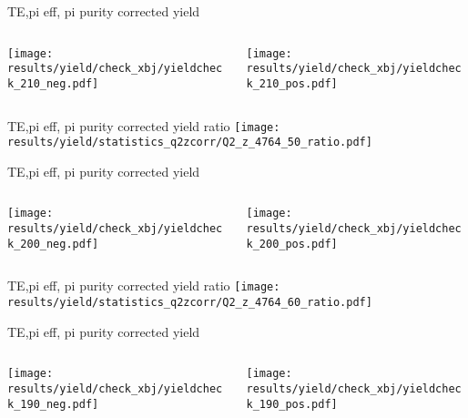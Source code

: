 \begin{frame}{TE,pi eff, pi purity corrected yield}
\begin{columns}
\begin{column}[T]{0.5\textwidth}
\texttt{[image: results/yield/check\_xbj/yieldcheck\_210\_neg.pdf]}
\end{column}
\begin{column}[T]{0.5\textwidth}
\texttt{[image: results/yield/check\_xbj/yieldcheck\_210\_pos.pdf]}
\end{column}
\end{columns}
\end{frame}
\begin{frame}{TE,pi eff, pi purity corrected yield ratio}
\texttt{[image: results/yield/statistics\_q2zcorr/Q2\_z\_4764\_50\_ratio.pdf]}
\end{frame}
\begin{frame}{TE,pi eff, pi purity corrected yield}
\begin{columns}
\begin{column}[T]{0.5\textwidth}
\texttt{[image: results/yield/check\_xbj/yieldcheck\_200\_neg.pdf]}
\end{column}
\begin{column}[T]{0.5\textwidth}
\texttt{[image: results/yield/check\_xbj/yieldcheck\_200\_pos.pdf]}
\end{column}
\end{columns}
\end{frame}
\begin{frame}{TE,pi eff, pi purity corrected yield ratio}
\texttt{[image: results/yield/statistics\_q2zcorr/Q2\_z\_4764\_60\_ratio.pdf]}
\end{frame}
\begin{frame}{TE,pi eff, pi purity corrected yield}
\begin{columns}
\begin{column}[T]{0.5\textwidth}
\texttt{[image: results/yield/check\_xbj/yieldcheck\_190\_neg.pdf]}
\end{column}
\begin{column}[T]{0.5\textwidth}
\texttt{[image: results/yield/check\_xbj/yieldcheck\_190\_pos.pdf]}
\end{column}
\end{columns}
\end{frame}
